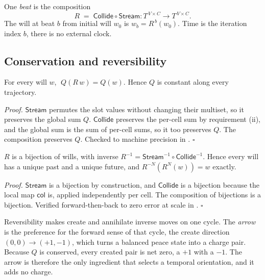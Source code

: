 \begin{definition}
One \emph{beat} is the composition
\[
R \;=\; \mathsf{Collide} \circ \mathsf{Stream} : T^{\,V \times C} \to T^{\,V \times C}.
\]
The will at beat $b$ from initial will $w_0$ is $w_b = R^{\,b}(w_0)$. Time is the iteration index $b$, there is no
external clock.
\end{definition}

\subsection{Conservation and reversibility}

\begin{proposition}
For every will $w$, $\; Q(R\, w) = Q(w)$. Hence $Q$ is constant along every trajectory.
\end{proposition}

\textit{Proof.} $\mathsf{Stream}$ permutes the slot values without changing their multiset, so it preserves the
global sum $Q$. $\mathsf{Collide}$ preserves the per-cell sum by requirement (ii), and the global sum is the sum
of per-cell sums, so it too preserves $Q$. The composition preserves $Q$. Checked to machine precision in
\cite{pollard2026vibetest}. \hfill$\square$

\begin{proposition}
$R$ is a bijection of wills, with inverse
$R^{-1} = \mathsf{Stream}^{-1} \circ \mathsf{Collide}^{-1}$. Hence every will has a unique past and a
unique future, and $R^{-N}(R^{N}(w)) = w$ exactly.
\end{proposition}

\textit{Proof.} $\mathsf{Stream}$ is a bijection by construction, and $\mathsf{Collide}$ is a bijection because
the local map $\mathsf{col}$ is, applied independently per cell. The composition of bijections is a bijection.
Verified forward-then-back to zero error at scale in \cite{pollard2026vibetest}. \hfill$\square$

\begin{result}
Reversibility makes create and annihilate inverse moves on one cycle. The \emph{arrow} is the preference for the
forward sense of that cycle, the create direction $(0,0) \to (+1,-1)$, which turns a balanced peace state into a
charge pair. Because $Q$ is conserved, every created pair is net zero, a $+1$ with a $-1$. The arrow is therefore
the only ingredient that selects a temporal orientation, and it adds no charge.
\end{result}

